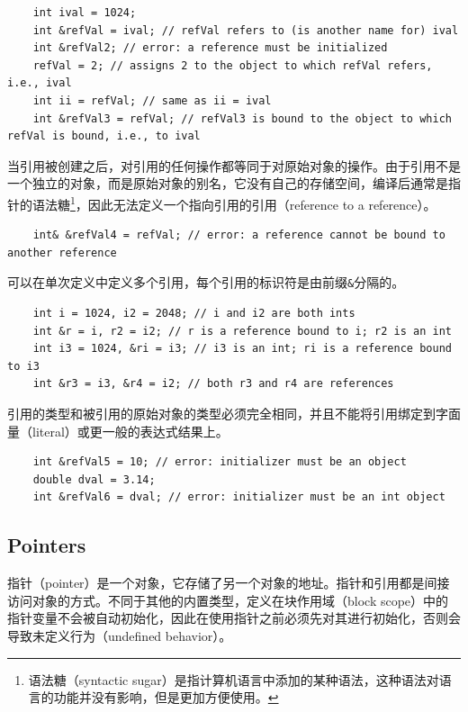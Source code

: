 \begin{verbatim}
    int ival = 1024;
    int &refVal = ival; // refVal refers to (is another name for) ival
    int &refVal2; // error: a reference must be initialized
    refVal = 2; // assigns 2 to the object to which refVal refers, i.e., ival
    int ii = refVal; // same as ii = ival
    int &refVal3 = refVal; // refVal3 is bound to the object to which refVal is bound, i.e., to ival
\end{verbatim}

当引用被创建之后，对引用的任何操作都等同于对原始对象的操作。由于引用不是一个独立的对象，而是原始对象的别名，它没有自己的存储空间，编译后通常是指针的语法糖\footnote{语法糖（syntactic sugar）是指计算机语言中添加的某种语法，这种语法对语言的功能并没有影响，但是更加方便使用。}，因此无法定义一个指向引用的引用（reference to a reference）。

\begin{verbatim}
    int& &refVal4 = refVal; // error: a reference cannot be bound to another reference
\end{verbatim}

可以在单次定义中定义多个引用，每个引用的标识符是由前缀\texttt{&}分隔的。

\begin{verbatim}
    int i = 1024, i2 = 2048; // i and i2 are both ints
    int &r = i, r2 = i2; // r is a reference bound to i; r2 is an int
    int i3 = 1024, &ri = i3; // i3 is an int; ri is a reference bound to i3
    int &r3 = i3, &r4 = i2; // both r3 and r4 are references
\end{verbatim}

引用的类型和被引用的原始对象的类型必须完全相同，并且不能将引用绑定到字面量（literal）或更一般的表达式结果上。

\begin{verbatim}
    int &refVal5 = 10; // error: initializer must be an object
    double dval = 3.14;
    int &refVal6 = dval; // error: initializer must be an int object
\end{verbatim}

\subsection{Pointers}
指针（pointer）是一个对象，它存储了另一个对象的地址。指针和引用都是间接访问对象的方式。不同于其他的内置类型，定义在块作用域（block scope）中的指针变量不会被自动初始化，因此在使用指针之前必须先对其进行初始化，否则会导致未定义行为（undefined behavior）。

